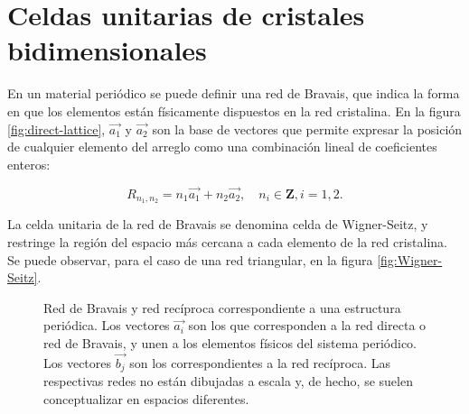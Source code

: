 \section{Celdas unitarias de cristales bidimensionales}
\label{sec:celdas-unitarias}
En un material periódico se puede definir una red de Bravais, que indica la forma en que los elementos están físicamente dispuestos en la red cristalina. En la figura \ref{fig:direct-lattice}, $\vec{a_1}$ y $\vec{a_2}$ son la base de vectores que permite expresar la posición de cualquier elemento del arreglo como una combinación lineal de coeficientes enteros:

\begin{equation}
R_{n_1,n_2} = n_1 \vec{a_1} + n_2 \vec{a_2}, \quad n_i \in \textbf{Z}, i={1,2}.
\end{equation}

La celda unitaria de la red de Bravais se denomina celda de Wigner-Seitz, y restringe la región del espacio más cercana a cada elemento de la red cristalina. Se puede observar, para el caso de una red triangular, en la figura \ref{fig:Wigner-Seitz}.

\begin{figure}[H]
	\centering 
	\hspace{0pt}
	\caption{Red de Bravais y red recíproca correspondiente a una estructura periódica. Los vectores $\vec{a_i}$ son los que corresponden a la red directa o red de Bravais, y unen a los elementos físicos del sistema periódico. Los vectores $\vec{b_j}$ son los correspondientes a la red recíproca. Las respectivas redes no están dibujadas a escala y, de hecho, se suelen conceptualizar en espacios diferentes.}
	\label{fig:direct-and-reciprocal-lattice}
\end{figure}

